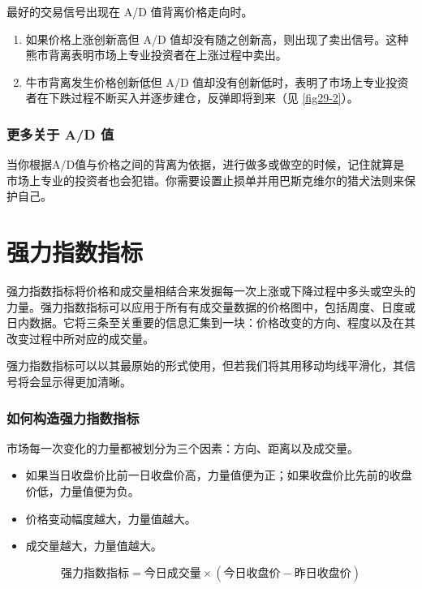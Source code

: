 最好的交易信号出现在 A/D 值背离价格走向时。
\begin{enumerate}
    \item 如果价格上涨创新高但 A/D 值却没有随之创新高，则出现了卖出信号。这种熊市背离表明市场上专业投资者在上涨过程中卖出。
    \item 牛市背离发生价格创新低但 A/D 值却没有创新低时，表明了市场上专业投资者在下跌过程不断买入并逐步建仓，反弹即将到来（见 \autoref{fig29-2}）。
\end{enumerate}
\subsubsection*{更多关于 A/D 值}
当你根据A/D值与价格之间的背离为依据，进行做多或做空的时候，记住就算是市场上专业的投资者也会犯错。你需要设置止损单并用巴斯克维尔的猎犬法则来保护自己。
\section{强力指数指标}
强力指数指标将价格和成交量相结合来发掘每一次上涨或下降过程中多头或空头的力量。强力指数指标可以应用于所有有成交量数据的价格图中，包括周度、日度或日内数据。它将三条至关重要的信息汇集到一块：价格改变的方向、程度以及在其改变过程中所对应的成交量。

强力指数指标可以以其最原始的形式使用，但若我们将其用移动均线平滑化，其信号将会显示得更加清晰。
\subsubsection*{如何构造强力指数指标}
市场每一次变化的力量都被划分为三个因素：方向、距离以及成交量。
\begin{itemize}
    \item 如果当日收盘价比前一日收盘价高，力量值便为正；如果收盘价比先前的收盘价低，力量值便为负。
    \item 价格变动幅度越大，力量值越大。
    \item 成交量越大，力量值越大。
\end{itemize}
\begin{equation}
    \text{强力指数指标}=\text{今日成交量}\times(\text{今日收盘价}-\text{昨日收盘价})
\end{equation}
